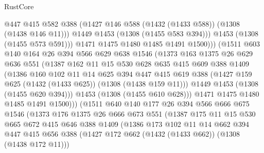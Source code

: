 \begin{lexlean}{RustCore}
\begin{coremodule}
                      @447
                      @415
                      @582
                      @388
                      (@1427 @146 @588 (@1432 (@1433 @588)) (@1308 (@1438 @146 @11)))
                      @1449
                      @1453
                      (@1308 (@1455 @583 @394)))
                    @1453
                    (@1308 (@1455 @573 @591)))
                  @1471
                  @1475
                  @1480
                  @1485
                  @1491
                  @1500)))
            (@1511
              @603
              @140
              @164
              @26
              @394
              @566
              @629
              @638
              @1546
              (@1373
                @163
                @1375
                @26
                @629
                @636
                @551
                (@1387
                  @162
                  @11
                  @15
                  @530
                  @628
                  @635
                  @415
                  @609
                  @388
                  @1409
                  (@1386
                    @160
                    @102
                    @11
                    @14
                    @625
                    @394
                    @447
                    @415
                    @619
                    @388
                    (@1427 @159 @625 (@1432 (@1433 @625)) (@1308 (@1438 @159 @11)))
                    @1449
                    @1453
                    (@1308 (@1455 @620 @394)))
                  @1453
                  (@1308 (@1455 @610 @628)))
                @1471
                @1475
                @1480
                @1485
                @1491
                @1500)))
          (@1511
            @640
            @140
            @177
            @26
            @394
            @566
            @666
            @675
            @1546
            (@1373
              @176
              @1375
              @26
              @666
              @673
              @551
              (@1387
                @175
                @11
                @15
                @530
                @665
                @672
                @415
                @646
                @388
                @1409
                (@1386
                  @173
                  @102
                  @11
                  @14
                  @662
                  @394
                  @447
                  @415
                  @656
                  @388
                  (@1427 @172 @662 (@1432 (@1433 @662)) (@1308 (@1438 @172 @11)))

\end{coremodule}
\end{lexlean}
